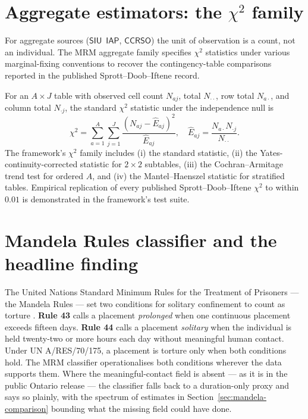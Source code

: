 \documentclass[article,shortnames,nojss]{jss}
\newcommand{\SIU}{\textsf{SIU}}
\newcommand{\CCRSO}{\textsf{CCRSO}}
\newcommand{\IAP}{\textsf{IAP}}
\begin{document}
\section[Aggregate estimators: the chi-squared family]{Aggregate estimators: the $\chi^{2}$ family}
\label{sec:aggregate}

For aggregate sources ($\SIU$~$\IAP$, $\CCRSO$) the unit of
observation is a count, not an individual. The MRM aggregate
family specifies $\chi^{2}$ statistics under various
marginal-fixing conventions to recover the contingency-table
comparisons reported in the published Sprott--Doob--Iftene
record.

For an $A \times J$ table with observed cell count $N_{aj}$, total
$N_{\cdot\cdot}$, row total $N_{a\cdot}$, and column total
$N_{\cdot j}$, the standard $\chi^{2}$ statistic under the
independence null is
\begin{equation}\label{eq:chi-sq}
\chi^{2} = \sum_{a=1}^{A} \sum_{j=1}^{J}
\frac{(N_{aj} - \hat{E}_{aj})^{2}}{\hat{E}_{aj}},
\quad
\hat{E}_{aj} = \frac{N_{a\cdot} N_{\cdot j}}{N_{\cdot\cdot}}.
\end{equation}
The framework's $\chi^{2}$ family includes (i) the standard
statistic, (ii) the Yates-continuity-corrected statistic for
$2\times2$ subtables, (iii) the Cochran--Armitage trend test for
ordered $A$, and (iv) the Mantel--Haenszel statistic
\citep{MantelHaenszel1959} for
stratified tables. Empirical replication of every published
Sprott--Doob--Iftene $\chi^{2}$ to within $0.01$ is demonstrated
in the framework's test suite.

\section{Mandela Rules classifier and the headline finding}
\label{sec:mandela}

The United Nations Standard Minimum Rules for the Treatment of
Prisoners --- the Mandela Rules --- set two conditions for
solitary confinement to count as torture \citep{MandelaRules2015}.
\textbf{Rule 43} calls a placement \emph{prolonged} when one
continuous placement exceeds fifteen days. \textbf{Rule 44}
calls a placement \emph{solitary} when the individual is held
twenty-two or more hours each day without meaningful human
contact. Under UN A/RES/70/175, a placement is torture only
when both conditions hold. The MRM classifier operationalises
both conditions wherever the data supports them. Where the
meaningful-contact field is absent --- as it is in the public
Ontario release --- the classifier falls back to a duration-only
proxy and says so plainly, with the spectrum of estimates in
Section~\ref{sec:mandela-comparison} bounding what the missing
field could have done.
\end{document}

